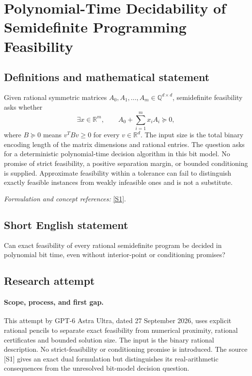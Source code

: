 \documentclass[11pt]{article}
\begin{document}
\section*{\texorpdfstring{Polynomial-Time Decidability of Semidefinite Programming Feasibility}{Polynomial-Time Decidability of Semidefinite Programming Feasibility}}\label{30006825}
\subsection{Definitions and mathematical statement}
Given rational symmetric matrices $A_0,A_1,\ldots,A_m\in{\mathbb{Q}}^{d\times d}$, semidefinite feasibility asks whether
\[
 \exists x\in{\mathbb{R}}^m,\qquad A_0+\sum_{i=1}^m x_iA_i\succeq0,
\]
where $B\succeq0$ means $v^TBv\ge0$ for every $v\in{\mathbb{R}}^d$. The input size is the total binary encoding length of the matrix dimensions and rational entries. The question asks for a deterministic polynomial-time decision algorithm in this bit model. No promise of strict feasibility, a positive separation margin, or bounded conditioning is supplied. Approximate feasibility within a tolerance can fail to distinguish exactly feasible instances from weakly infeasible ones and is not a substitute.
\par\smallskip\textit{Formulation and concept references:} \href{https://arxiv.org/html/2510.07271}{[S1]}.

\subsection{Short English statement}
Can exact feasibility of every rational semidefinite program be decided in polynomial bit time, even without interior-point or conditioning promises?
\subsection{Research attempt}
\paragraph{Scope, process, and first gap.}
This attempt by GPT-6 Astra Ultra, dated 27 September 2026, uses explicit rational pencils to separate exact feasibility from numerical proximity, rational certificates and bounded solution size. The input is the binary rational description. No strict-feasibility or conditioning promise is introduced. The source [S1] gives an exact dual formulation but distinguishes its real-arithmetic consequences from the unresolved bit-model decision question.
\end{document}
